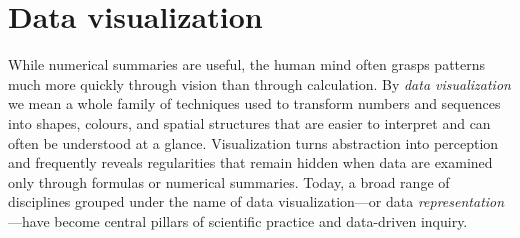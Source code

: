 \section{Data visualization}

While numerical summaries are useful, the human mind often grasps patterns much more quickly through vision than through calculation. By \textit{data visualization} we mean a whole family of techniques used to transform numbers and sequences into shapes, colours, and spatial structures that are easier to interpret and can often be understood at a glance. Visualization turns abstraction into perception and frequently reveals regularities that remain hidden when data are examined only through formulas or numerical summaries. Today, a broad range of disciplines grouped under the name of data visualization—or data \textit{representation}—have become central pillars of scientific practice and data-driven inquiry.

